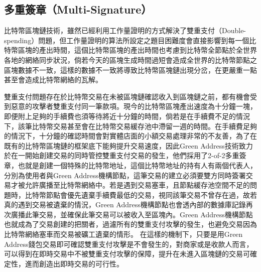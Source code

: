 			\subsection{多重簽章（Multi-Signature）}
			 	比特幣區塊鏈技術，雖然已經利用工作量證明的方式解決了雙重支付（Double-spending）問題\supercite{Informationpropagationinthebitcoinnetwork}\supercite{Double-spendingfastpaymentsinbitcoin}，但工作量證明的算法所設定之題目困難度會直接影響到每一個比特幣區塊的產出時間，這個比特幣區塊的產出時間也考慮到比特幣全節點於全世界各地的網絡同步狀況，倘若今天的區塊生成時間過短會造成全世界的比特幣節點之區塊數據不一致，這樣的數據不一致將導致比特幣區塊鏈出現分岔，在更嚴重一點甚至會造成比特幣網絡的瓦解。

			 	雙重支付問題存在於比特幣交易在未被區塊鏈確認收入到區塊鏈之前，都有機會受到惡意的攻擊者雙重支付同一筆款項。現今的比特幣區塊產出速度為十分鐘一塊，即便附上足夠的手續費也須等待將近十分鐘的時間，倘若是在手續費不足的情況下，該筆比特幣交易甚至會在比特幣交易緩存池中滯留一週的時間。在手續費足夠的情況下，十分鐘的確認時間會對實體店面的小額交易處理非常的不友善，為了在既有的比特幣區塊鏈的框架底下能夠提升交易速度，因此Green Address技術致力於在一開始創建交易的同時管控雙重支付交易的發生，他們採用了2-of-2多重簽章，也就是創建一個特殊的比特幣地址，這個比特幣地址的持有人有兩個代表人，分別為使用者與Green Address機構節點，這筆交易的建立必須要雙方同時簽署交易才被允許廣播至比特幣網絡中。若是遇到交易塞車，且節點緩存池空間不足的問題時，比特幣節點會優先遺棄手續費最低的交易，視同該筆交易不曾存在過，故若真的遇到交易被遺棄的情況，Green Address機構節點也會透內部的數據庫記錄再次廣播此筆交易，並確保此筆交易可以被收入至區塊內。Green Address機構節點也就成為了交易創建的把關者，過濾所有的雙重支付攻擊的發生，也避免交易因為比特幣網絡塞車而交易被礦工遺棄的情形。
			 	在這樣的機制下，只要是用Green Address錢包交易即可確認雙重支付攻擊是不會發生的，對商家或是收款人而言，可以得到在即時交易中不被雙重支付攻擊的保障，提升在未進入區塊鏈的交易可確定性，進而創造出即時交易的可行性。

